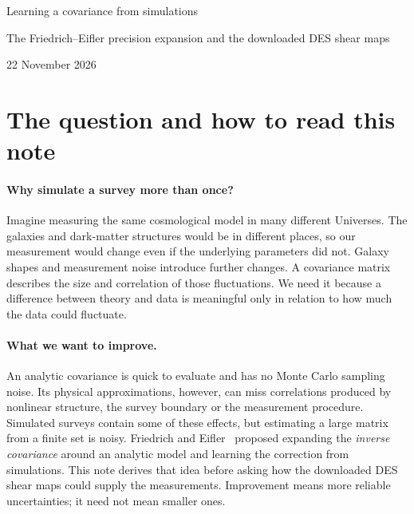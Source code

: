 \documentclass[11pt]{article}
\begin{document}
\begin{center}
{\LARGE Learning a covariance from simulations\par}
\vspace{0.5em}
{\large The Friedrich--Eifler precision expansion and the downloaded DES shear maps\par}
\vspace{0.5em}
22 November 2026
\end{center}

\section{The question and how to read this note}
\paragraph{Why simulate a survey more than once?}
Imagine measuring the same cosmological model in many different Universes.
The galaxies and dark-matter structures would be in different places, so our
measurement would change even if the underlying parameters did not.
Galaxy shapes and measurement noise introduce further changes. A covariance
matrix describes the size and correlation of those fluctuations. We need it
because a difference between theory and data is meaningful only in relation
to how much the data could fluctuate.

\paragraph{What we want to improve.}
An analytic covariance is quick to evaluate and has no Monte Carlo sampling
noise. Its physical approximations, however, can miss correlations produced
by nonlinear structure, the survey boundary or the measurement procedure.
Simulated surveys contain some of these effects, but estimating a large
matrix from a finite set is noisy. Friedrich and Eifler~\cite{pme} proposed
expanding the \emph{inverse covariance} around an analytic model and learning
the correction from simulations. This note derives that idea before asking
how the downloaded DES shear maps could supply the measurements.
Improvement means more reliable uncertainties; it need not mean smaller ones.
\end{document}
